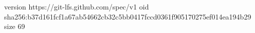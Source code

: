 version https://git-lfs.github.com/spec/v1
oid sha256:b37d161fcf1a67ab54662cb32c5bb0417fccd0361f905170275ef014ea194b29
size 69
